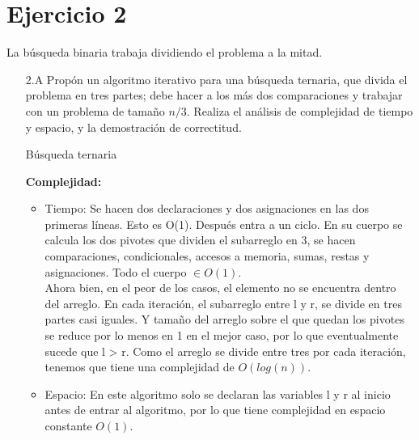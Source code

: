 \documentclass[12pt]{article}
\begin{document}
\section*{Ejercicio 2}
La búsqueda binaria trabaja dividiendo el problema a la mitad.
\begin{itemize}
    \item[2.A] Propón un algoritmo iterativo para una búsqueda ternaria, que divida el problema en tres partes; debe hacer a los más dos comparaciones y trabajar con un problema de tamaño $n/3$. Realiza el análisis de complejidad de tiempo y espacio, y la demostración de correctitud.\\
    \begin{algorithm}[H]
    \caption{Búsqueda ternaria}
    \SetAlgoLined
    \end{algorithm}
    \textbf{Complejidad:}
    \begin{itemize}
        \item Tiempo: Se hacen dos declaraciones y dos asignaciones en las dos primeras líneas. Esto es O(1).
        Después entra a un ciclo.
        En su cuerpo se calcula los dos pivotes que dividen el subarreglo en 3, se hacen comparaciones, condicionales, accesos a memoria, sumas, restas y asignaciones. Todo el cuerpo $\in O(1)$.\\
        Ahora bien, en el peor de los casos, el elemento no se encuentra dentro del arreglo. En cada iteración, el subarreglo entre l y r, se divide en tres partes casi iguales. Y tamaño del arreglo sobre el que quedan los pivotes se reduce por lo menos en 1 en el mejor caso, por lo que eventualmente sucede que l > r. Como el arreglo se divide entre tres por cada iteración, tenemos que tiene una complejidad de $O(log(n))$.\\
        \item Espacio: En este algoritmo solo se declaran las variables l y r al inicio antes de entrar al algoritmo, por lo que tiene complejidad en espacio constante $O(1)$.
    \end{itemize}


\end{itemize}
\end{document}
